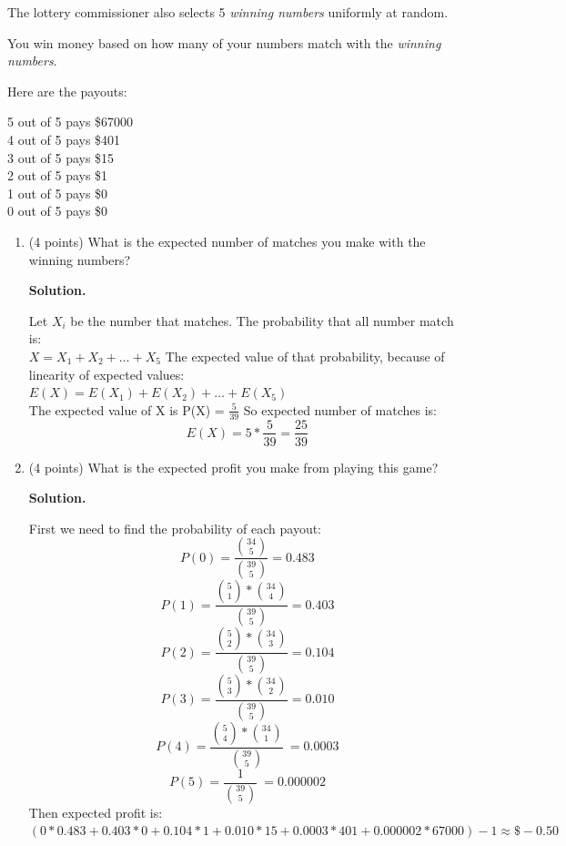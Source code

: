 \documentclass[10pt,letterpaper,unboxed,cm]{article}
\newenvironment{solution}
  {\par\noindent\textbf{Solution.}\ }
  {\par}
\begin{document}
\begin{enumerate}
The lottery commissioner also selects 5 \emph{winning numbers} uniformly at random.

You win money based on how many of your numbers match with the \emph{winning numbers}.

Here are the payouts:

5 out of 5 pays \$67000\\
4 out of 5 pays \$401\\
3 out of 5 pays \$15\\
2 out of 5 pays \$1\\
1 out of 5 pays \$0\\
0 out of 5 pays \$0\\


\begin{enumerate}
\item (4 points)
What is the expected number of matches you make with the winning numbers?

\begin{solution}
    
    Let $X_i$ be the number that matches. The probability that all number match is:\\
    \(X = X_1 + X_2 + \dots + X_5\)
    The expected value of that probability, because of linearity of expected values:\\
    \(E(X) = E(X_1) + E(X_2) + \dots + E(X_5)\)\\
    The expected value of X is P(X) = $\frac{5}{39}$
    So expected number of matches is:
    \[\boxed{E(X) = 5*\frac{5}{39} = \frac{25}{39}}\]


\end{solution}

\item (4 points)
What is the expected profit you make from playing this game?

\begin{solution}

    First we need to find the probability of each payout:\\
    \[P(0) = \frac{\binom{34}{5}}{\binom{39}{5}} = 0.483\]
    \[P(1) = \frac{\binom{5}{1}*\binom{34}{4}}{\binom{39}{5}} = 0.403\]
    \[P(2) = \frac{\binom{5}{2}*\binom{34}{3}}{\binom{39}{5}} = 0.104\]
    \[P(3) = \frac{\binom{5}{3}*\binom{34}{2}}{\binom{39}{5}} = 0.010\]
    \[P(4) = \frac{\binom{5}{4}*\binom{34}{1}}{\binom{39}{5}}\ = 0.0003\]
    \[P(5) = \frac{1}{\binom{39}{5}}\ = 0.000002\]
    Then expected profit is:
    $(0 * 0.483 + 0.403 * 0 + 0.104 * 1 + 0.010 * 15 + 0.0003 * 401 + 0.000002 * 67000) - 1 \approx \boxed{\mathdollar-0.50}$



\end{solution}
\end{enumerate}
\end{enumerate}
\end{document}
